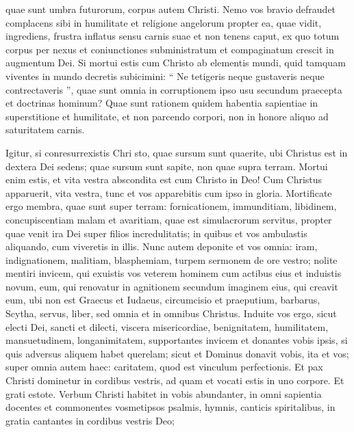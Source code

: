 \begin{biblechapter}
\begin{biblechapter}
\verse quae sunt umbra futurorum, corpus autem Christi. 
\verse Nemo vos bravio defraudet complacens sibi in humilitate et religione angelorum propter ea, quae vidit, ingrediens, frustra inflatus sensu carnis suae 
\verse et non tenens caput, ex quo totum corpus per nexus et coniunctiones subministratum et compaginatum crescit in augmentum Dei.
 \verse Si mortui estis cum Christo ab elementis mundi, quid tamquam viventes in mundo decretis subicimini: 
\verse “ Ne tetigeris neque gustaveris neque contrectaveris ”, 
\verse quae sunt omnia in corruptionem ipso usu secundum praecepta et doctrinas hominum? 
\verse Quae sunt rationem quidem habentia sapientiae in superstitione et humilitate, et non parcendo corpori, non in honore aliquo ad saturitatem carnis.
 
\begin{biblechapter}
 \verse Igitur, si conresurrexistis Chri sto, quae sursum sunt quaerite, ubi Christus est in dextera Dei sedens; 
\verse quae sursum sunt sapite, non quae supra terram. 
 \verse Mortui enim estis, et vita vestra abscondita est cum Christo in Deo! 
\verse Cum Christus apparuerit, vita vestra, tunc et vos apparebitis cum ipso in gloria.
 \verse Mortificate ergo membra, quae sunt super terram: fornicationem, immunditiam, libidinem, concupiscentiam malam et avaritiam, quae est simulacrorum servitus, 
 \verse propter quae venit ira Dei super filios incredulitatis; 
\verse in quibus et vos ambulastis aliquando, cum viveretis in illis. 
\verse Nunc autem deponite et vos omnia: iram, indignationem, malitiam, blasphemiam, turpem sermonem de ore vestro; 
\verse nolite mentiri invicem, qui exuistis vos veterem hominem cum actibus eius 
\verse et induistis novum, eum, qui renovatur in agnitionem secundum imaginem eius, qui creavit eum, 
\verse ubi non est Graecus et Iudaeus, circumcisio et praeputium, barbarus, Scytha, servus, liber, sed omnia et in omnibus Christus.
 \verse Induite vos ergo, sicut electi Dei, sancti et dilecti, viscera misericordiae, benignitatem, humilitatem, mansuetudinem, longanimitatem, 
\verse supportantes invicem et donantes vobis ipsis, si quis adversus aliquem habet querelam; sicut et Dominus donavit vobis, ita et vos; 
\verse super omnia autem haec: caritatem, quod est vinculum perfectionis. 
\verse Et pax Christi dominetur in cordibus vestris, ad quam et vocati estis in uno corpore. Et grati estote.
 \verse Verbum Christi habitet in vobis abundanter, in omni sapientia docentes et commonentes vosmetipsos psalmis, hymnis, canticis spiritalibus, in gratia cantantes in cordibus vestris Deo; 

\end{biblechapter}
\end{biblechapter}
\end{biblechapter}
